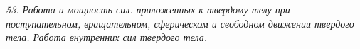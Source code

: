 \emph{53. Работа и мощность сил. приложенных к твердому телу при поступательном,
вращательном, сферическом и свободном движении твердого тела. Работа
внутренних сил твердого тела.}

\newpage
